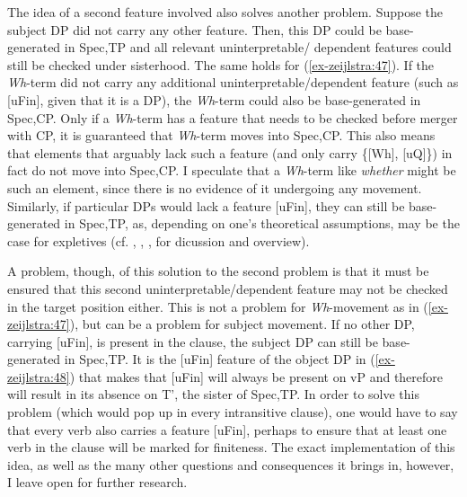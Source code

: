 \documentclass[output=paper
,modfonts
,nonflat]{langsci/langscibook}
\begin{document}
\begin{figure}[!h]
	\begin{exe}
	\end{exe} \vspace{-0.7cm}
\end{figure}
 \noindent
The idea of a second feature involved also solves another problem. Suppose the subject DP did not carry any other feature. Then, this DP could be base-generated in Spec,TP and all relevant uninterpretable/ dependent features could still be checked under sisterhood. The same holds for (\ref{ex-zeijlstra:47}). If the \textit{Wh}-term did not carry any additional uninterpretable/dependent feature (such as [uFin], given that it is a DP), the \textit{Wh}-term could also be base-generated in Spec,CP. Only if a \textit{Wh}-term has a feature that needs to be checked before merger with CP, it is guaranteed that \textit{Wh}-term moves into Spec,CP. This also means that elements that arguably lack such a feature (and only carry \{[Wh], [uQ]\}) in fact do not move into Spec,CP. I speculate that a \textit{Wh}{}-term like \textit{whether} might be such an element, since there is no evidence of it undergoing any movement. Similarly, if particular DPs would lack a feature [uFin], they can still be base-generated in Spec,TP, as, depending on one’s theoretical assumptions, may be the case for expletives (cf. \citealt{Chomsky2000}, \citealt{Boskovic2002}, \citealt{Deal2009}, \citealt{Wu2018} for dicussion and overview). 

A problem, though, of this solution to the second problem is that it must be ensured that this second uninterpretable/dependent feature may not be checked in the target position either. This is not a problem for \textit{Wh}-movement as in (\ref{ex-zeijlstra:47}), but can be a problem for subject movement. If no other DP, carrying [uFin], is present in the clause, the subject DP can still be base-generated in Spec,TP. It is the [uFin] feature of the object DP in (\ref{ex-zeijlstra:48}) that makes that [uFin] will always be present on vP and therefore will result in its absence on T’, the sister of Spec,TP. In order to solve this problem (which would pop up in every intransitive clause), one would have to say that every verb also carries a feature [uFin], perhaps to ensure that at least one verb in the clause will be marked for finiteness. The exact implementation of this idea, as well as the many other questions and consequences it brings in, however, I leave open for further research.
\end{document}
